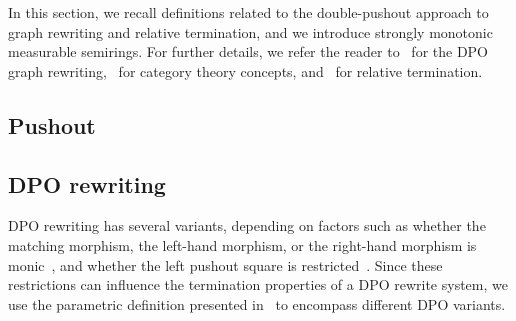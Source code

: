  
In this section, we recall definitions related to the double-pushout approach to graph rewriting and relative termination, and we introduce strongly monotonic measurable semirings. For further details, we refer the reader to~\cite{konig2018tutorial,ehrig1997algebraic,habel2001double} for the DPO graph rewriting,~\cite{pierce1991basic, barr1990category} for category theory concepts, and~\cite{geser1990relative} for relative termination.
 
\subsection{Pushout}
\label{preliminaries:pushout}















\subsection{DPO rewriting}
\label{preliminaries:grs}


DPO rewriting has several variants, depending on factors such as whether the matching morphism, the left-hand morphism, or the right-hand morphism is monic~\cite{habel2001double}, and whether the left pushout square is restricted~\cite{behr2021concurrency,behr2023fundamentals}. Since these restrictions can influence the termination properties of a DPO rewrite system,  we use the parametric definition presented in~\cite{EndrullisOverbeek2024Generalized} to encompass different DPO variants.

